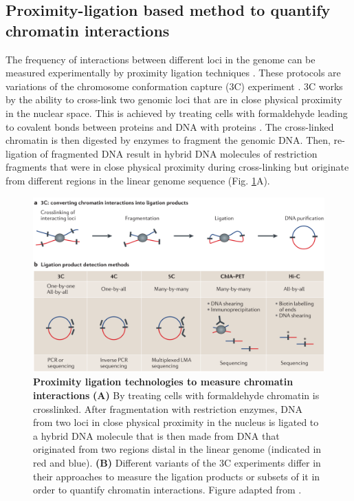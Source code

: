 \documentclass[a4paper,twoside=true,openright,parskip=full,chapterprefix=true,11pt,headings=normal,bibliography=totoc,listof=totoc,titlepage=on,captions=tableabove,draft=false]{scrreprt}
\theoremstyle{definition}
\theoremstyle{definition}
\theoremstyle{definition}
\theoremstyle{remark}
\begin{document}
\hypertarget{proximity-ligation}{%
\subsection{Proximity-ligation based method to quantify chromatin
interactions}\label{proximity-ligation}}

The frequency of interactions between different loci in the genome can
be measured experimentally by proximity ligation techniques
\citep{Sati2017, Schmitt2016}. These protocols are variations of the
chromosome conformation capture (3C) experiment \citep{Dekker2002}. 3C
works by the ability to cross-link two genomic loci that are in close
physical proximity in the nuclear space. This is achieved by treating
cells with formaldehyde leading to covalent bonds between proteins and
DNA with proteins \citep{Hoffman2015}. The cross-linked chromatin is
then digested by enzymes to fragment the genomic DNA. Then, re-ligation
of fragmented DNA result in hybrid DNA molecules of restriction
fragments that were in close physical proximity during cross-linking but
originate from different regions in the linear genome sequence
\citep{Dekker2013, Andrey2017} (Fig. \ref{fig:ProximityLigation}A).

\begin{figure}

{\centering \includegraphics[width=0.8\linewidth]{figures/Dekker2013_3C} 

}

\caption{\textbf{Proximity ligation technologies to
measure chromatin interactions} \textbf{(A)} By treating cells with
formaldehyde chromatin is crosslinked. After fragmentation with
restriction enzymes, DNA from two loci in close physical proximity in
the nucleus is ligated to a hybrid DNA molecule that is then made from
DNA that originated from two regions distal in the linear genome
(indicated in red and blue). \textbf{(B)} Different variants of the 3C
experiments differ in their approaches to measure the ligation products
or subsets of it in order to quantify chromatin interactions. Figure
adapted from \citep{Dekker2013}.}\label{fig:ProximityLigation}
\end{figure}
\end{document}
